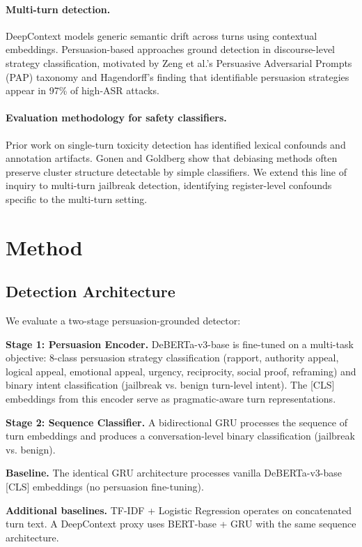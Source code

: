 \documentclass[11pt]{article}
\begin{document}
\paragraph{Multi-turn detection.}
DeepContext models generic semantic drift across turns using contextual embeddings. Persuasion-based approaches ground detection in discourse-level strategy classification, motivated by Zeng et al.'s Persuasive Adversarial Prompts (PAP) taxonomy and Hagendorff's finding that identifiable persuasion strategies appear in 97\% of high-ASR attacks.

\paragraph{Evaluation methodology for safety classifiers.}
Prior work on single-turn toxicity detection has identified lexical confounds and annotation artifacts. Gonen and Goldberg show that debiasing methods often preserve cluster structure detectable by simple classifiers. We extend this line of inquiry to multi-turn jailbreak detection, identifying register-level confounds specific to the multi-turn setting.

\section{Method}

\subsection{Detection Architecture}

We evaluate a two-stage persuasion-grounded detector:

\textbf{Stage 1: Persuasion Encoder.} DeBERTa-v3-base is fine-tuned on a multi-task objective: 8-class persuasion strategy classification (rapport, authority appeal, logical appeal, emotional appeal, urgency, reciprocity, social proof, reframing) and binary intent classification (jailbreak vs. benign turn-level intent). The [CLS] embeddings from this encoder serve as pragmatic-aware turn representations.

\textbf{Stage 2: Sequence Classifier.} A bidirectional GRU processes the sequence of turn embeddings and produces a conversation-level binary classification (jailbreak vs. benign).

\textbf{Baseline.} The identical GRU architecture processes vanilla DeBERTa-v3-base [CLS] embeddings (no persuasion fine-tuning).

\textbf{Additional baselines.} TF-IDF + Logistic Regression operates on concatenated turn text. A DeepContext proxy uses BERT-base + GRU with the same sequence architecture.
\end{document}

